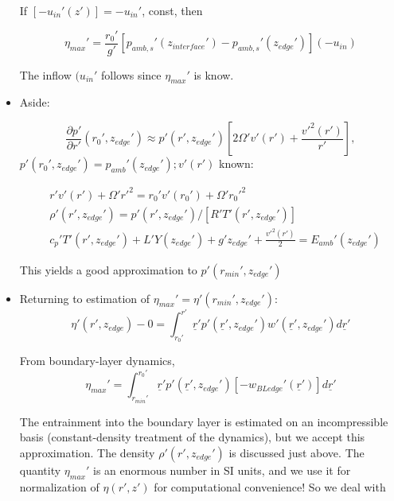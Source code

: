 \documentclass[preprint, prX]{revtex4}
\newcommand{\pd}[2]{\frac{\partial#1}{\partial#2}}
\begin{document}
\begin{itemize}
If $[-u_{in}'(z')] = -u_{in}'$, const, then

\begin{equation}
	\eta_{max}' = \frac{r_0'}{g'} \left [ p_{amb,s}'(z_{interface}') - p_{amb,s}'(z_{edge}')\right ] (-u_{in})
\end{equation}

The inflow $(u_{in}'$ follows since $\eta_{max}'$ is know.

\item Aside: 

\begin{equation}
	\pd{ p'}{ r'}(r_0', z_{edge}') \approx p'(r',z_{edge}') \left [ 2 \Omega' v'(r') + \frac{v'^2(r')}{r'} \right ], 
\end{equation}
$p'(r_0', z_{edge}') = p_{amb}'(z_{edge}'); v'(r')$ known:

\begin{equation}
\begin{split}
	&r'v'(r') + \Omega' r'^2 = r_0' v'(r_0') + \Omega' r_0'^2 \\
	&\rho'(r', z_{edge}') = p'(r',z_{edge}') /[R' T'(r',z_{edge}')]\\
	&c_p' T'(r',z_{edge}') + L'Y(z_{edge}') + g'z_{edge}' + \frac{v'^2(r')}{2} = E_{amb}'(z_{edge}')
\end{split}
\end{equation}

This yields a good approximation to $p'(r_{min}', z_{edge}')$

\item Returning to estimation of $\eta_{max}' = \eta'(r_{min}', z_{edge}')$:
\begin{equation}
	\eta'(r',z_{edge}) - 0 = \int_{r_0'}^{r'} \underline{r}' p'(\underline{r}', z_{edge}') w'(\underline{r}', z_{edge}') d\underline{r}'
\end{equation}

From boundary-layer dynamics,
\begin{equation}
	\eta_{max}' = \int_{r_{min}'}^{r_0'} \underline{r}' p'(\underline{r}', z_{edge}')\left [ -w_{BL edge}'(\underline{r}')\right ] d\underline{r}'
\end{equation}

The entrainment into the boundary layer is estimated on an incompressible basis (constant-density treatment of the dynamics), but we accept this approximation. The density $\rho'(r',z_{edge}')$ is discussed just above. The quantity $\eta_{max}'$ is an enormous number in SI units, and we use it for normalization of $\eta(r',z')$ for computational convenience! So we deal with 


\end{itemize}
\end{document}
